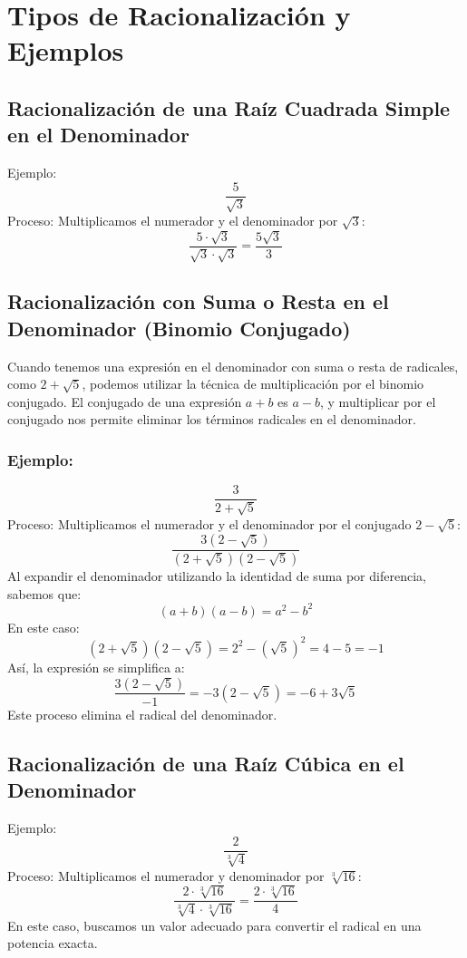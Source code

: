 \documentclass[
  11pt,
  letterpaper,
  answers
]{exam}
\begin{document}
\section{Tipos de Racionalización y Ejemplos}

\subsection{Racionalización de una Raíz Cuadrada Simple en el Denominador}
Ejemplo:
\[
\frac{5}{\sqrt{3}}
\]
Proceso: Multiplicamos el numerador y el denominador por \( \sqrt{3} \):
\[
\frac{5 \cdot \sqrt{3}}{\sqrt{3} \cdot \sqrt{3}} = \frac{5 \sqrt{3}}{3}
\]

\subsection{Racionalización con Suma o Resta en el Denominador (Binomio Conjugado)}
Cuando tenemos una expresión en el denominador con suma o resta de radicales, como \( 2 + \sqrt{5} \), podemos utilizar la técnica de multiplicación por el binomio conjugado. El conjugado de una expresión \( a + b \) es \( a - b \), y multiplicar por el conjugado nos permite eliminar los términos radicales en el denominador.

\subsubsection*{Ejemplo:}
\[
\frac{3}{2 + \sqrt{5}}
\]
Proceso: Multiplicamos el numerador y el denominador por el conjugado \( 2 - \sqrt{5} \):
\[
\frac{3(2 - \sqrt{5})}{(2 + \sqrt{5})(2 - \sqrt{5})}
\]
Al expandir el denominador utilizando la identidad de suma por diferencia, sabemos que:
\[
(a + b)(a - b) = a^2 - b^2
\]
En este caso:
\[
(2 + \sqrt{5})(2 - \sqrt{5}) = 2^2 - (\sqrt{5})^2 = 4 - 5 = -1
\]
Así, la expresión se simplifica a:
\[
\frac{3(2 - \sqrt{5})}{-1} = -3(2 - \sqrt{5}) = -6 + 3\sqrt{5}
\]
Este proceso elimina el radical del denominador.

\subsection{Racionalización de una Raíz Cúbica en el Denominador}
Ejemplo:
\[
\frac{2}{\sqrt[3]{4}}
\]
Proceso: Multiplicamos el numerador y denominador por \( \sqrt[3]{16} \):
\[
\frac{2 \cdot \sqrt[3]{16}}{\sqrt[3]{4} \cdot \sqrt[3]{16}} = \frac{2 \cdot \sqrt[3]{16}}{4}
\]
En este caso, buscamos un valor adecuado para convertir el radical en una potencia exacta.
\end{document}
